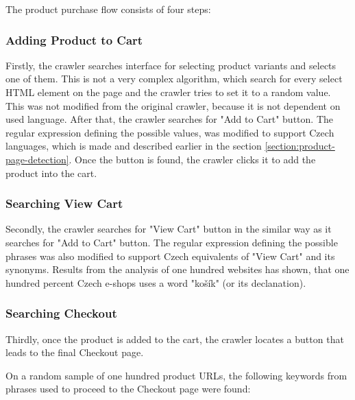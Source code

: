    The product purchase flow consists of four steps:

    \subsubsection*{Adding Product to Cart}
        Firstly, the crawler searches interface for selecting product variants and selects one of them. This is not a very complex algorithm, which search for every select HTML element on the page and the crawler tries to set it to a random value. This was not modified from the original crawler, because it is not dependent on used language. After that, the crawler searches for "Add to Cart" button. The regular expression defining the possible values, was modified to support Czech languages, which is made and described earlier in the section \ref{section:product-page-detection}. Once the button is found, the crawler clicks it to add the product into the cart.

    \subsubsection*{Searching View Cart}
        Secondly, the crawler searches for "View Cart" button in the similar way as it searches for "Add to Cart" button. The regular expression defining the possible phrases was also modified to support Czech equivalents of "View Cart" and its synonyms. Results from the analysis of one hundred websites has shown, that one hundred percent Czech e-shops uses a word "košík" (or its declanation).


    \subsubsection*{Searching Checkout}
        Thirdly, once the product is added to the cart, the crawler locates a button that leads to the final Checkout page.

        On a random sample of one hundred product URLs, the following keywords from phrases used to proceed to the Checkout page were found:


